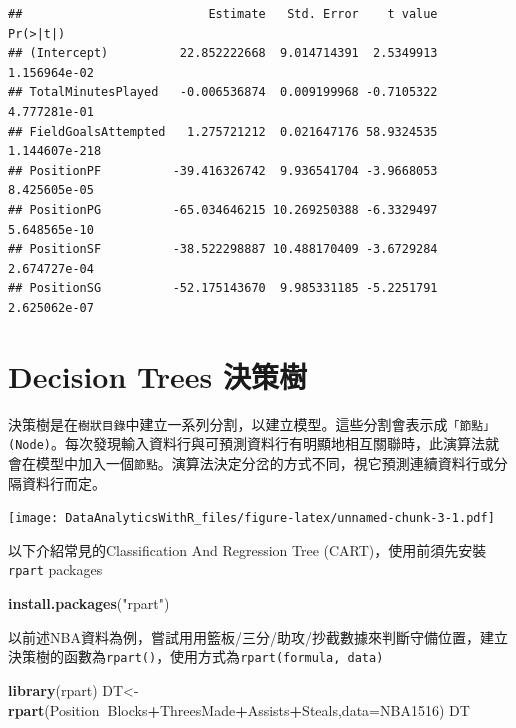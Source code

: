 \documentclass[]{book}
\newenvironment{Shaded}{\begin{snugshade}}{\end{snugshade}}
\newcommand{\DataTypeTok}[1]{\textcolor[rgb]{0.13,0.29,0.53}{#1}}
\newcommand{\KeywordTok}[1]{\textcolor[rgb]{0.13,0.29,0.53}{\textbf{#1}}}
\newcommand{\NormalTok}[1]{#1}
\newcommand{\OperatorTok}[1]{\textcolor[rgb]{0.81,0.36,0.00}{\textbf{#1}}}
\newcommand{\StringTok}[1]{\textcolor[rgb]{0.31,0.60,0.02}{#1}}
\begin{document}
\begin{verbatim}
##                          Estimate   Std. Error    t value      Pr(>|t|)
## (Intercept)          22.852222668  9.014714391  2.5349913  1.156964e-02
## TotalMinutesPlayed   -0.006536874  0.009199968 -0.7105322  4.777281e-01
## FieldGoalsAttempted   1.275721212  0.021647176 58.9324535 1.144607e-218
## PositionPF          -39.416326742  9.936541704 -3.9668053  8.425605e-05
## PositionPG          -65.034646215 10.269250388 -6.3329497  5.648565e-10
## PositionSF          -38.522298887 10.488170409 -3.6729284  2.674727e-04
## PositionSG          -52.175143670  9.985331185 -5.2251791  2.625062e-07
\end{verbatim}

\hypertarget{decision-trees-ux6c7aux7b56ux6a39}{%
\section{Decision Trees 決策樹}\label{decision-trees-ux6c7aux7b56ux6a39}}

決策樹是在\texttt{樹狀目錄}中建立一系列分割，以建立模型。這些分割會表示成\texttt{「節點」(Node)}。每次發現輸入資料行與可預測資料行有明顯地相互關聯時，此演算法就會在模型中加入一個\texttt{節點}。演算法決定分岔的方式不同，視它預測連續資料行或分隔資料行而定。

\texttt{[image: DataAnalyticsWithR\_files/figure-latex/unnamed-chunk-3-1.pdf]}

以下介紹常見的Classification And Regression Tree (CART)，使用前須先安裝\texttt{rpart} packages \citep{R-rpart}

\begin{Shaded}
\begin{Highlighting}[]
\KeywordTok{install.packages}\NormalTok{(}\StringTok{"rpart"}\NormalTok{)}
\end{Highlighting}
\end{Shaded}

以前述NBA資料為例，嘗試用用籃板/三分/助攻/抄截數據來判斷守備位置，建立決策樹的函數為\texttt{rpart()}，使用方式為\texttt{rpart(formula,\ data)}

\begin{Shaded}
\begin{Highlighting}[]
\KeywordTok{library}\NormalTok{(rpart)}
\NormalTok{DT<-}\KeywordTok{rpart}\NormalTok{(Position}\OperatorTok{~}\NormalTok{Blocks}\OperatorTok{+}\NormalTok{ThreesMade}\OperatorTok{+}\NormalTok{Assists}\OperatorTok{+}\NormalTok{Steals,}\DataTypeTok{data=}\NormalTok{NBA1516)}
\NormalTok{DT}
\end{Highlighting}
\end{Shaded}
\end{document}
